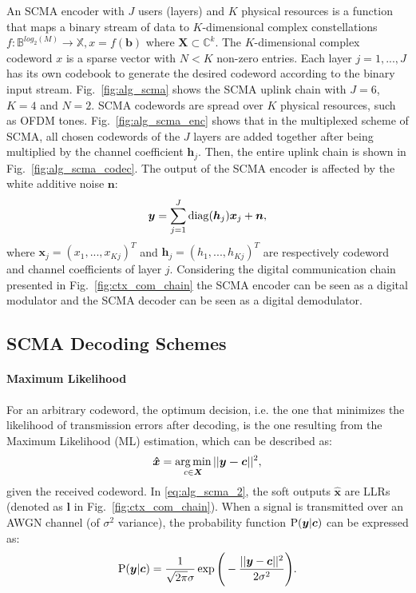 An SCMA encoder with $J$ users (layers) and $K$ physical resources is a function
that maps a binary stream of data to $K$-dimensional complex constellations
$f : \mathbb{B}^{log_{2}(M)} \rightarrow \mathbb{X}, x = f(\bm{b})$ where
$\bm{X} \subset \mathbb{C}^k$. The $K$-dimensional complex codeword $x$ is a
sparse vector with $N < K$ non-zero entries. Each layer $j=1, ..., J$ has its
own codebook to generate the desired codeword according to the binary input
stream. Fig.~\ref{fig:alg_scma} shows the SCMA uplink chain with $J = 6$,
$K = 4$ and $N = 2$. SCMA codewords are spread over $K$ physical resources, such
as OFDM tones. Fig.~\ref{fig:alg_scma_enc} shows that in the multiplexed scheme
of SCMA, all chosen codewords of the $J$ layers are added together after being
multiplied by the channel coefficient $\bm{h}_j$. Then, the entire uplink chain
is shown in Fig.~\ref{fig:alg_scma_codec}. The output of the SCMA encoder is
affected by the white additive noise $\bm{n}$:
\begin{equation}
  \label{eq:alg_scma_1}
  \bm{y} = \sum\limits_{j=1}^J \operatorname{diag}(\bm{h}_j)\bm{x}_j+\bm{n},
\end{equation}
where $\bm{x}_j=(x_1,...,x_{Kj})^T$ and $\bm{h}_j=(h_1,...,h_{Kj})^T$ are
respectively codeword and channel coefficients of layer $j$.
Considering the digital communication chain presented in
Fig.~\ref{fig:ctx_com_chain} the SCMA encoder can be seen as a digital modulator
and the SCMA decoder can be seen as a digital demodulator.

\subsection{SCMA Decoding Schemes}
\label{sec:alg_scma_detection}

\paragraph{Maximum Likelihood}
\label{sec:alg_scma_ml}

For an arbitrary codeword, the optimum decision, i.e. the one that minimizes the
likelihood of transmission errors after decoding, is the one resulting from the
Maximum Likelihood (ML) estimation, which can be described as:
\begin{equation}
  \label{eq:alg_scma_2}
  \bm{\hat{x}} = \operatorname*{arg\,min}_{c \in \bm{X}}||\bm{y - c}||^2,
\end{equation}
given the received codeword. In \eqref{eq:alg_scma_2}, the soft outputs
$\hat{\bm{x}}$ are LLRs (denoted as $\bm{l}$ in Fig.~\ref{fig:ctx_com_chain}).
When a signal is transmitted over an AWGN channel (of $\sigma^2$ variance), the
probability function $\operatorname{P}(\bm{y}|\bm{c})$ can be expressed as:
\begin{equation}
  \label{eq:alg_scma_4}
  \operatorname{P}(\bm{y}|\bm{c}) = \frac{1}{\sqrt{2\pi}\sigma}\exp
  \Bigg(-\frac{||\bm{y}-\bm{c}||^2}{2\sigma^2}\Bigg).
\end{equation}

